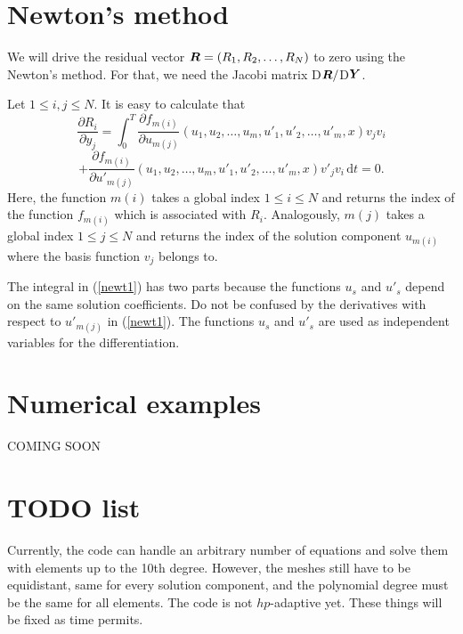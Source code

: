 \documentclass[12pt]{article}
\newcommand{\bfY}{\mbox{\boldmath $Y$}}
\newcommand{\bfR}{\mbox{\boldmath $R$}}
\def\be{\begin{equation}}
\def\ee{\end{equation}}
\def\d{\mbox{d}}
\begin{document}
\section{Newton's method}

We will drive the residual vector $\bfR = (R_1, R_2, \ldots, R_N)$ to zero using the Newton's
method. For that, we need the Jacobi matrix D$\bfR/$D$\bfY$. 

Let $1 \le i, j \le N$. 
It is easy to calculate that 
$$
\frac{\partial R_i}{\partial y_j} 
= \int_0^T \frac{\partial f_{m(i)}}{\partial u_{m(j)}}(u_1, u_2, \ldots, u_m, u'_1, u'_2, \ldots, u'_m, x)v_jv_i
$$
\be\label{newt1}
+ \frac{\partial f_{m(i)}}{\partial u'_{m(j)}}(u_1, u_2, \ldots, u_m, u'_1, u'_2, \ldots, u'_m, x)v'_jv_i \, \d t = 0.
\ee
Here, the function $m(i)$ takes a global index $1 \le i \le N$ and returns the index of the 
function $f_{m(i)}$ which is associated with $R_i$. Analogously, $m(j)$ takes 
a global index $1 \le j \le N$ and returns the index of the solution component $u_{m(i)}$ 
where the basis function $v_j$ belongs to.

The integral in (\ref{newt1}) has two parts because 
the functions $u_s$ and $u'_s$ depend on the same solution coefficients.
Do not be confused by the derivatives with respect to $u'_{m(j)}$ in (\ref{newt1}). 
The functions $u_s$ and $u'_s$ are used as independent variables for the differentiation.


\section{Numerical examples}

COMING SOON

\section{TODO list}

Currently, the code can handle an arbitrary number of equations 
and solve them with elements up to the 10th degree. However, 
the meshes still have to be equidistant, same for every solution 
component, and the polynomial degree must be the same for all
elements. The code is not $hp$-adaptive yet. These things will be 
fixed as time permits.
\end{document}
